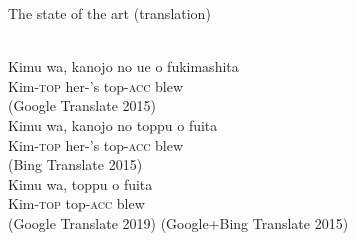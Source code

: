 \begin{frame}{The state of the art (translation)}

\begin{exe}
  \ex {}
  \trans \glll {}    \\
  {Kimu wa,} {kanojo no} {ue o} fukimashita \\
  Kim-\textsc{top} her-'s top-\textsc{acc} blew \\  
  \trans  {} (Google Translate
  2015)
 \trans \glll {}    \\
  {Kimu wa,} {kanojo no} {toppu o} fuita \\
  Kim-\textsc{top} her-'s top-\textsc{acc} blew \\  
  \trans  {} (Bing Translate 2015)
 \trans \glll {}   \\
  {Kimu wa,} {toppu o} fuita \\
  Kim-\textsc{top}  top-\textsc{acc} blew \\  
  \trans  {} (Google Translate 2019)
  \ex {}
  \trans {} (Google+Bing Translate 2015)
\end{exe}

\end{frame}

